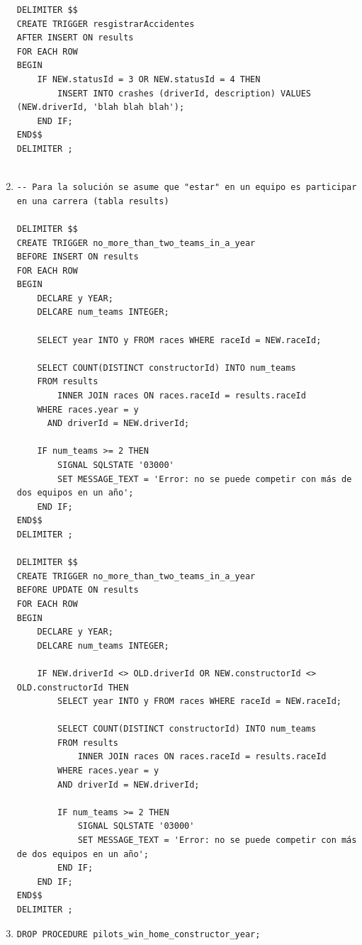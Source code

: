 \documentclass[a4paper]{article}
\begin{document}
\begin{enumerate}
\begin{verbatim}
DELIMITER $$
CREATE TRIGGER resgistrarAccidentes
AFTER INSERT ON results
FOR EACH ROW
BEGIN
    IF NEW.statusId = 3 OR NEW.statusId = 4 THEN
    	INSERT INTO crashes (driverId, description) VALUES (NEW.driverId, 'blah blah blah');
    END IF;
END$$
DELIMITER ;            
            
    \end{verbatim}
    
    \item 
    \begin{verbatim}
-- Para la solución se asume que "estar" en un equipo es participar en una carrera (tabla results)

DELIMITER $$
CREATE TRIGGER no_more_than_two_teams_in_a_year
BEFORE INSERT ON results
FOR EACH ROW
BEGIN
    DECLARE y YEAR;
    DELCARE num_teams INTEGER;

    SELECT year INTO y FROM races WHERE raceId = NEW.raceId;

    SELECT COUNT(DISTINCT constructorId) INTO num_teams
    FROM results
        INNER JOIN races ON races.raceId = results.raceId
    WHERE races.year = y
      AND driverId = NEW.driverId;

    IF num_teams >= 2 THEN 
        SIGNAL SQLSTATE '03000'
        SET MESSAGE_TEXT = 'Error: no se puede competir con más de dos equipos en un año';
    END IF;
END$$
DELIMITER ;

DELIMITER $$
CREATE TRIGGER no_more_than_two_teams_in_a_year
BEFORE UPDATE ON results
FOR EACH ROW
BEGIN
    DECLARE y YEAR;
    DELCARE num_teams INTEGER;

    IF NEW.driverId <> OLD.driverId OR NEW.constructorId <> OLD.constructorId THEN
        SELECT year INTO y FROM races WHERE raceId = NEW.raceId;

        SELECT COUNT(DISTINCT constructorId) INTO num_teams
        FROM results
            INNER JOIN races ON races.raceId = results.raceId
        WHERE races.year = y
        AND driverId = NEW.driverId;

        IF num_teams >= 2 THEN 
            SIGNAL SQLSTATE '03000'
            SET MESSAGE_TEXT = 'Error: no se puede competir con más de dos equipos en un año';
        END IF;
    END IF;
END$$
DELIMITER ;
    \end{verbatim}

    \item 
    \begin{verbatim}
DROP PROCEDURE pilots_win_home_constructor_year;


\end{verbatim}
\end{enumerate}
\end{document}
